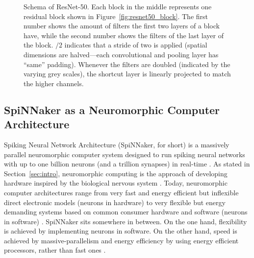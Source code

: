 \documentclass[]{article}
\begin{document}
\begin{figure}
\begin{center}
  \end{center}
  \caption{Schema of ResNet-50. Each block in the middle represents
    one residual block shown in Figure~\ref{fig:resnet50_block}.
    The first number shows the amount of filters the first two layers
    of a block have, while the second number shows the filters of the
    last layer of the block. $/2$ indicates that a stride of two is
    applied (spatial dimensions are halved---each convolutional and
    pooling layer has ``same'' padding). Whenever the filters are
    doubled (indicated by the varying grey scales), the shortcut layer
    is linearly projected to match the higher channels.}
  \label{fig:resnet50}
\end{figure}



\subsection{SpiNNaker as a Neuromorphic Computer Architecture} %
\label{subsec:intro_spinn}

Spiking Neural Network Architecture (SpiNNaker, for short) is a
massively parallel neuromorphic computer system designed to run
spiking neural networks with up to one billion neurons (and a trillion
synapses) in real-time \citep{painkras_et_al_2013}.
As stated in Section~\ref{sec:intro}, neuromorphic computing is
the approach of developing hardware inspired by the biological
nervous system \citep{mead_1989}.
Today, neuromorphic computer architectures range from very fast and
energy efficient but inflexible direct electronic models
(neurons in hardware) \citep{indiveri_et_al_2011} to very flexible but
energy demanding systems based on common consumer hardware and
software (neurons in software) \citep{plesser_et_al_2007}.
SpiNNaker sits somewhere in between.
On the one hand, flexibility is achieved by implementing neurons in
software.
On the other hand, speed is achieved by massive-parallelism and
energy efficiency by using energy efficient processors, rather than
fast ones \citep{furber_et_al_2020}.
\end{document}
